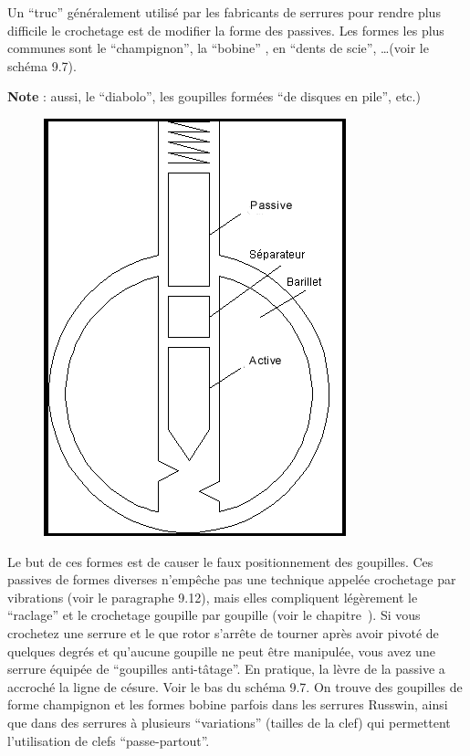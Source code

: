 \documentclass[a4paper,french,11pt,twoside]{report}
\begin{document}
Un \enquote{truc} généralement utilisé par les fabricants de serrures pour rendre plus difficile le crochetage est de modifier la forme des passives. Les formes les plus communes sont le \enquote{champignon}, la \enquote{bobine} , en \enquote{dents de scie}, \ldots (voir le schéma 9.7).

\noindent \textbf{Note} : aussi, le \enquote{diabolo}, les  goupilles formées \enquote{de disques en pile}, etc.)

\begin{figure}[h] \begin{center}
        \includegraphics[scale=0.6]{images/Image24}
        \caption{}
\end{center} \end{figure}

Le but de ces formes est de causer le faux positionnement des goupilles. Ces passives de formes diverses n'empêche pas une technique appelée crochetage par vibrations (voir le paragraphe 9.12), mais elles compliquent légèrement le \enquote{raclage} et le crochetage goupille par goupille (voir le chapitre~).
Si vous crochetez une serrure et le que rotor s'arrête de tourner après avoir pivoté de quelques degrés et qu'aucune goupille ne peut être manipulée, vous avez une serrure équipée de \enquote{goupilles anti-tâtage}. En pratique, la lèvre de la passive a accroché la ligne de césure. Voir le bas du schéma 9.7. On trouve des goupilles de forme champignon et les formes bobine parfois dans les serrures Russwin, ainsi que dans des serrures à plusieurs \enquote{variations} (tailles de la clef) qui permettent l'utilisation de clefs \enquote{passe-partout}.
\end{document}
